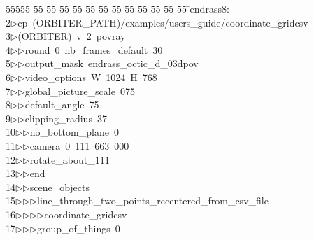 %
%
\begin{tabbing}
55555 \= 55 \= 55 \= 55 \= 55 \= 55 \= 55 \= 55 \= 55 \= 55 \= 55 \= 55 \= 55 \= \>endrass8:\\[0pt]
2\>$\triangleright$\>cp\ (ORBITER\_PATH)/examples/users\_guide/coordinate\_gridcsv\ \\[0pt]
3\>$\triangleright$\>(ORBITER)\ v\ 2\ povray\ \\[0pt]
4\>$\triangleright$\>$\triangleright$\>round\ 0\ nb\_frames\_default\ 30\ \\[0pt]
5\>$\triangleright$\>$\triangleright$\>output\_mask\ endrass\_octic\_d\_03dpov\ \\[0pt]
6\>$\triangleright$\>$\triangleright$\>video\_options\ W\ 1024\ H\ 768\ \\[0pt]
7\>$\triangleright$\>$\triangleright$\>global\_picture\_scale\ 075\ \\[0pt]
8\>$\triangleright$\>$\triangleright$\>default\_angle\ 75\ \\[0pt]
9\>$\triangleright$\>$\triangleright$\>clipping\_radius\ 37\ \\[0pt]
10\>$\triangleright$\>$\triangleright$\>no\_bottom\_plane\ 0\ \\[0pt]
11\>$\triangleright$\>$\triangleright$\>camera\ 0\ 111\ 663\ 000\ \\[0pt]
12\>$\triangleright$\>$\triangleright$\>rotate\_about\_111\ \\[0pt]
13\>$\triangleright$\>$\triangleright$\>end\ \\[0pt]
14\>$\triangleright$\>$\triangleright$\>scene\_objects\ \\[0pt]
15\>$\triangleright$\>$\triangleright$\>$\triangleright$\>line\_through\_two\_points\_recentered\_from\_csv\_file\ \\[0pt]
16\>$\triangleright$\>$\triangleright$\>$\triangleright$\>$\triangleright$\>coordinate\_gridcsv\ \\[0pt]
17\>$\triangleright$\>$\triangleright$\>$\triangleright$\>group\_of\_things\ 0\ \\[0pt]

\end{tabbing}
